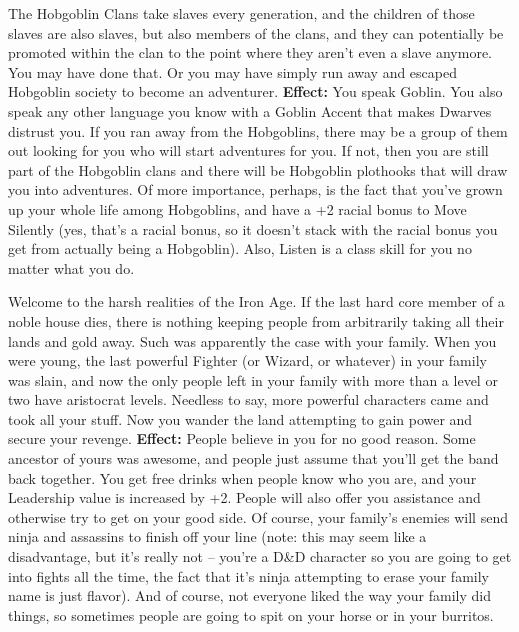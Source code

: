 \medskip{}
{The Hobgoblin Clans take slaves every generation, and the children of those slaves are also slaves, but also members of the clans, and they can potentially be promoted within the clan to the point where they aren't even a slave anymore. You may have done that. Or you may have simply run away and escaped Hobgoblin society to become an adventurer.}
\textbf{Effect:}{ You speak Goblin. You also speak any other language you know with a Goblin Accent that makes Dwarves distrust you. If you ran away from the Hobgoblins, there may be a group of them out looking for you who will start adventures for you. If not, then you are still part of the Hobgoblin clans and there will be Hobgoblin plothooks that will draw you into adventures. Of more importance, perhaps, is the fact that you've grown up your whole life among Hobgoblins, and have a +2 racial bonus to Move Silently (yes, that's a racial bonus, so it doesn't stack with the racial bonus you get from actually being a Hobgoblin). Also, Listen is a class skill for you no matter what you do.}

\medskip{}
{Welcome to the harsh realities of the Iron Age. If the last hard core member of a noble house dies, there is nothing keeping people from arbitrarily taking all their lands and gold away. Such was apparently the case with your family. When you were young, the last powerful Fighter (or Wizard, or whatever) in your family was slain, and now the only people left in your family with more than a level or two have aristocrat levels. Needless to say, more powerful characters came and took all your stuff. Now you wander the land attempting to gain power and secure your revenge.}
\textbf{Effect:}{ People believe in you for no good reason. Some ancestor of yours was awesome, and people just assume that you'll get the band back together. You get free drinks when people know who you are, and your Leadership value is increased by +2. People will also offer you assistance and otherwise try to get on your good side. Of course, your family's enemies will send ninja and assassins to finish off your line (note: this may seem like a disadvantage, but it's really not -- you're a D\&D character so you are going to get into fights all the time, the fact that it's ninja attempting to erase your family name is just flavor). And of course, not everyone liked the way your family did things, so sometimes people are going to spit on your horse or in your burritos.}

